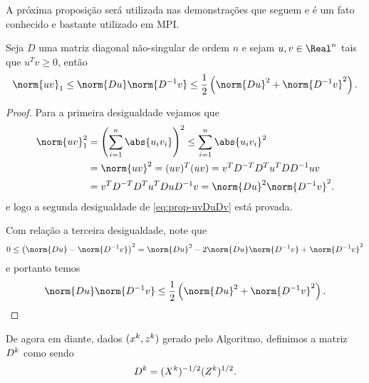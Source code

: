 
A próxima proposição será utilizada nas demonstrações que seguem e é um fato conhecido e bastante utilizado em \ac{MPI}.

\begin{prop}\label{prop:norm-uv}
	Seja $D$ uma matriz diagonal não-singular de ordem $n$ e sejam $u,v\in\Real^n$ tais que $u^Tv\geq0$, então 
	\begin{equation}
		\label{eq:prop-uvDuDv}
	 \norm{uv}_1 \leq \norm{Du}\norm{D^{-1}v} \leq \frac{1}{2}\left(\norm{Du}^{2} + \norm{D^{-1}v}^{2}\right).
	\end{equation}
\end{prop}
\begin{proof} Para a primeira desigualdade  vejamos que 
\[
	\begin{aligned}
		\norm{uv}_1^{2} & = \left( \sum_{i=1}^{n}\abs{u_i v_i}  \right)^{2} \leq  \sum_{i=1}^{n}\abs{u_iv_i}^{2}\\
						& = \norm{uv}^{2} = (uv)^{T}(uv)  = v^{T}D^{-T}D^{T}u^{T}DD^{-1} uv\\
						& = v^{T}D^{-T}D^{T}u^{T}DuD^{-1}v = \norm{Du}^{2}\norm{D^{-1}v}^{2}.
	\end{aligned}
	\]
e logo a segunda desigualdade de \eqref{eq:prop-uvDuDv} está provada. 

Com relação a terceira desigualdade, note que  
\[
0 \leq \left(\norm{Du} - \norm{D^{-1}v}\right)^{2} = \norm{Du}^{2} - 2\norm{Du}\norm{D^{-1}v} + \norm{D^{-1}v}^{2}
\]
e portanto temos
\[
\norm{Du}\norm{D^{-1}v} \leq \frac{1}{2}\left(\norm{Du}^{2} + \norm{D^{-1}v}^{2}\right). \qedhere
\]
\end{proof}

De agora em diante, dados $(x^{k},z^{k})$ gerado pelo Algoritmo, definimos a matriz $D^{k}$ como sendo
\[
D^{k} =(X^{k})^{-1/2}(Z^{k})^{1/2}.
\]

